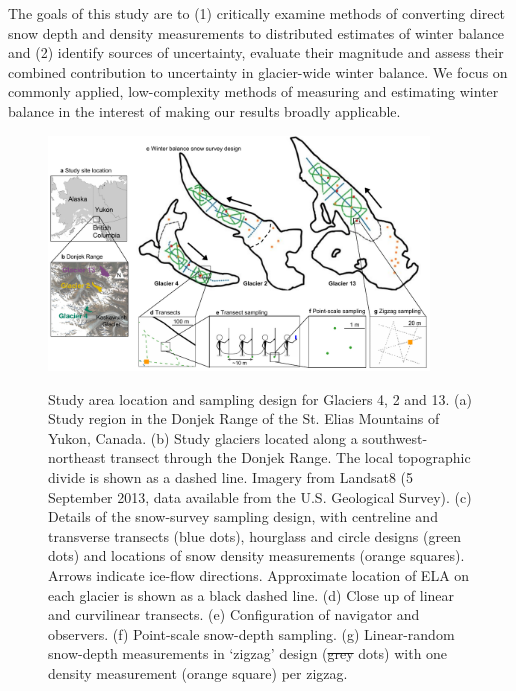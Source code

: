 \documentclass[review,oneside, letterpaper]{igs} %
\providecommand{\DIFadd}[1]{{\protect\color{blue}\uwave{#1}}} %
\providecommand{\DIFdel}[1]{{\protect\color{red}\sout{#1}}}                      %
\providecommand{\DIFaddFL}[1]{\DIFadd{#1}} %
\providecommand{\DIFdelFL}[1]{\DIFdel{#1}} %
\providecommand{\DIFaddbeginFL}{} %
\providecommand{\DIFaddendFL}{} %
\providecommand{\DIFdelbeginFL}{} %
\providecommand{\DIFdelendFL}{} %
\newcommand{\DIFscaledelfig}{0.5}
\newlength{\DIFdelgraphicswidth} %
\newlength{\DIFdelgraphicsheight} %
\newcommand{\DIFaddincludegraphics}[2][]{{\color{blue}\fbox{\DIFOincludegraphics[#1]{#2}}}} %
\newcommand{\DIFdelincludegraphics}[2][]{%
\sbox{\DIFdelgraphicsbox}{\DIFOincludegraphics[#1]{#2}}%
\settoboxwidth{\DIFdelgraphicswidth}{\DIFdelgraphicsbox} %
\settoboxtotalheight{\DIFdelgraphicsheight}{\DIFdelgraphicsbox} %
\scalebox{\DIFscaledelfig}{%
\parbox[b]{\DIFdelgraphicswidth}{\usebox{\DIFdelgraphicsbox}\\[-\baselineskip] \rule{\DIFdelgraphicswidth}{0em}}\llap{\resizebox{\DIFdelgraphicswidth}{\DIFdelgraphicsheight}{%
\setlength{\unitlength}{\DIFdelgraphicswidth}%
\begin{picture}(1,1)%
\thicklines\linethickness{2pt} %
{\color[rgb]{1,0,0}\put(0,0){\framebox(1,1){}}}%
{\color[rgb]{1,0,0}\put(0,0){\line( 1,1){1}}}%
{\color[rgb]{1,0,0}\put(0,1){\line(1,-1){1}}}%
\end{picture}%
}\hspace*{3pt}}} %
} %
\DeclareRobustCommand{\DIFaddbeginFL}{\DIFOaddbeginFL \let\includegraphics\DIFaddincludegraphics} %
\DeclareRobustCommand{\DIFaddendFL}{\DIFOaddendFL \let\includegraphics\DIFOincludegraphics} %
\DeclareRobustCommand{\DIFdelbeginFL}{\DIFOdelbeginFL \let\includegraphics\DIFdelincludegraphics} %
\DeclareRobustCommand{\DIFdelendFL}{\DIFOaddendFL \let\includegraphics\DIFOincludegraphics} %
\begin{document}
The goals of this study are to (1) critically examine methods of converting direct snow depth and density measurements to distributed estimates of winter balance and (2) identify sources of uncertainty, evaluate their magnitude and assess their combined contribution to uncertainty in glacier-wide winter balance. We focus on commonly applied, low-complexity methods of measuring and estimating winter balance in the interest of making our results broadly applicable.


\begin{figure}
	\centering
	\includegraphics[width =0.9\textwidth]{Sampling.pdf}\\
	\caption{Study area location and sampling design for Glaciers 4, 2 and 13. (a) Study region in the Donjek Range of the St. Elias Mountains of Yukon, Canada. (b) Study glaciers located along a southwest-northeast transect through the Donjek Range. The local topographic divide is shown as a dashed line. Imagery from Landsat8 (5 September 2013, data available from the U.S. Geological Survey). (c) Details of the snow-survey sampling design, with centreline and transverse transects (blue dots), hourglass and circle designs (green dots) and locations of snow density measurements (orange squares). Arrows indicate ice-flow directions. Approximate location of ELA on each glacier is shown as a black dashed line. (d) Close up of linear and curvilinear transects. (e) Configuration of navigator and observers. (f) Point-scale snow-depth sampling. (g) Linear-random snow-depth measurements in `zigzag' design (\DIFdelbeginFL \DIFdelFL{grey }\DIFdelendFL \DIFaddbeginFL \DIFaddFL{red }\DIFaddendFL dots) with one density measurement (orange square) per zigzag.}
	\label{fig:Sampling}
\end{figure}
\end{document}
